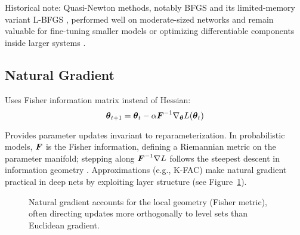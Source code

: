 Historical note: Quasi-Newton methods, notably BFGS and its limited-memory variant L-BFGS \cite{LiuNocedal1989}, performed well on moderate-sized networks and remain valuable for fine-tuning smaller models or optimizing differentiable components inside larger systems \cite{GoodfellowEtAl2016,Bishop2006}.

\subsection{Natural Gradient}

Uses Fisher information matrix instead of Hessian:
\begin{equation}
\boldsymbol{\theta}_{t+1} = \boldsymbol{\theta}_t - \alpha \boldsymbol{F}^{-1} \nabla_{\boldsymbol{\theta}} L(\boldsymbol{\theta}_t)
\end{equation}

Provides parameter updates invariant to reparameterization. In probabilistic models, \(\boldsymbol{F}\) is the Fisher information, defining a Riemannian metric on the parameter manifold; stepping along \(\boldsymbol{F}^{-1}\nabla L\) follows the steepest descent in information geometry \cite{Amari1998}. Approximations (e.g., K-FAC) make natural gradient practical in deep nets by exploiting layer structure (see Figure~\ref{fig:natural-gradient}).

\begin{figure}[h]
\centering
{}
\caption{Natural gradient accounts for the local geometry (Fisher metric), often directing updates more orthogonally to level sets than Euclidean gradient.}
\label{fig:natural-gradient}
\end{figure}

